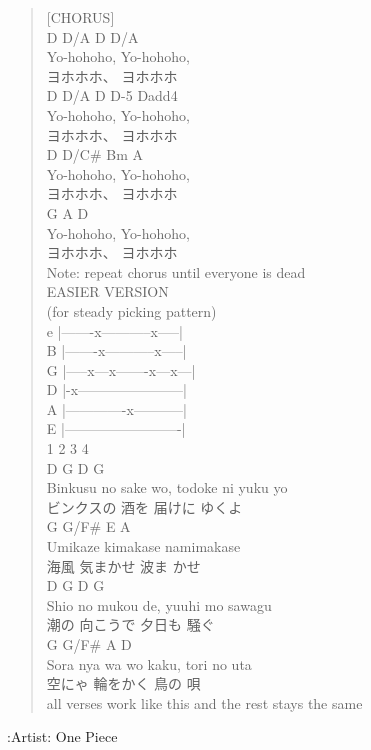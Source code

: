 \documentclass[11pt]{article}
\begin{document}
\begin{verse}
\vspace*{1em}
\vspace*{1em}
[CHORUS]\\
D       D/A     D      D/A\\
Yo-hohoho, Yo-hohoho,\\
ヨホホホ、    ヨホホホ\\
D       D/A     D      D-5   Dadd4\\
Yo-hohoho, Yo-hohoho,\\
ヨホホホ、    ヨホホホ\\
D       D/C\#    Bm     A\\
Yo-hohoho, Yo-hohoho,\\
ヨホホホ、    ヨホホホ\\
G       A       D\\
Yo-hohoho, Yo-hohoho,\\
ヨホホホ、    ヨホホホ\\
\vspace*{1em}
Note: repeat chorus until everyone is dead\\
\vspace*{1em}
\vspace*{1em}
EASIER VERSION\\
(for steady picking pattern)\\
\vspace*{1em}
e |-------x-----------x-----|\\
B |-------x-----------x-----|\\
G |-----x---x-------x---x---|\\
D |-x-----------------------|\\
A |-------------x-----------|\\
E |-------------------------|\\
\hspace*{4em}1     2     3     4\\
\vspace*{1em}
D          G        D         G\\
Binkusu no sake wo, todoke ni yuku yo\\
ビンクスの   酒を     届けに     ゆくよ\\
G       G/F\#     E       A\\
Umikaze kimakase namimakase\\
海風     気まかせ  波ま   かせ\\
D         G       D        G\\
Shio no mukou de, yuuhi mo sawagu\\
潮の     向こうで   夕日も    騒ぐ\\
G         G/F\#        A        D\\
Sora nya  wa wo kaku, tori no uta\\
空にゃ     輪をかく     鳥の     唄\\
\vspace*{1em}
all verses work like this and the rest stays the same\\
\end{verse}
:Artist:   One Piece
\clearpage
\end{document}
